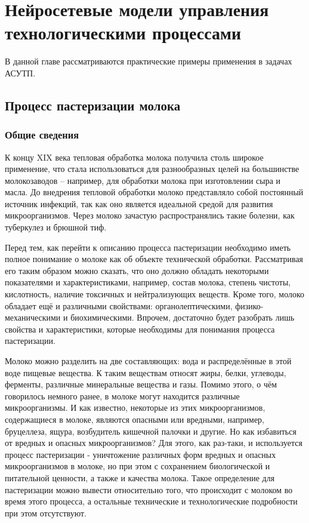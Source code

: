 \chapter{Нейросетевые модели управления технологическими процессами}

В данной главе рассматриваются практические примеры применения в задачах АСУТП.

\section{Процесс пастеризации молока}

\subsection{Общие сведения}

К концу XIX века тепловая обработка молока получила столь широкое применение, что стала использоваться для разнообразных целей на большинстве молокозаводов – например, для обработки молока при изготовлении сыра и масла. До внедрения тепловой обработки молоко представляло собой постоянный источник инфекций, так как оно является идеальной средой для развития микроорганизмов. Через молоко зачастую распространялись такие болезни, как туберкулез и брюшной тиф.

Перед тем, как перейти к описанию процесса пастеризации необходимо иметь полное понимание о молоке как об объекте технической обработки. Рассматривая его таким образом можно сказать, что оно должно обладать некоторыми показателями и характеристиками, например, состав молока, степень чистоты, кислотность, наличие токсичных и нейтрализующих веществ. Кроме того, молоко обладает ещё и различными свойствами: органолептическими, физико-механическими и биохимическими. Впрочем, достаточно будет разобрать лишь свойства и характеристики, которые необходимы для понимания процесса пастеризации.

Молоко можно разделить на две составляющих: вода и распределённые в этой воде пищевые вещества. К таким веществам относят жиры, белки, углеводы, ферменты, различные минеральные вещества и газы. Помимо этого, о чём говорилось немного ранее, в молоке могут находится различные микроорганизмы. И как известно, некоторые из этих микроорганизмов, содержащиеся в молоке, являются опасными или вредными, например, бруцеллеза, ящура, возбудитель кишечной палочки и другие. Но как избавиться от вредных и опасных микроорганизмов?  Для этого, как раз-таки, и используется процесс пастеризации - уничтожение различных форм вредных и опасных микроорганизмов в молоке, но при этом с сохранением биологической и питательной ценности, а также и качества молока. Такое определение для пастеризации можно вывести относительно того, что происходит с молоком во время этого процесса, а остальные технические и технологические подробности при этом отсутствуют.


